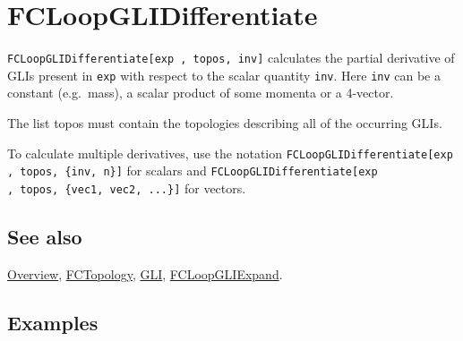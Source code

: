 \documentclass[../FeynCalcManual.tex]{subfiles}
\begin{document}
\hypertarget{fcloopglidifferentiate}{%
\section{FCLoopGLIDifferentiate}\label{fcloopglidifferentiate}}

\texttt{FCLoopGLIDifferentiate[\allowbreak{}exp ,\ \allowbreak{}topos,\ \allowbreak{}inv]}
calculates the partial derivative of GLIs present in \texttt{exp} with
respect to the scalar quantity \texttt{inv}. Here \texttt{inv} can be a
constant (e.g.~mass), a scalar product of some momenta or a 4-vector.

The list topos must contain the topologies describing all of the
occurring GLIs.

To calculate multiple derivatives, use the notation
\texttt{FCLoopGLIDifferentiate[\allowbreak{}exp ,\ \allowbreak{}topos,\ \allowbreak{}\{\allowbreak{}inv,\ \allowbreak{}n\}]}
for scalars and
\texttt{FCLoopGLIDifferentiate[\allowbreak{}exp ,\ \allowbreak{}topos,\ \allowbreak{}\{\allowbreak{}vec1,\ \allowbreak{}vec2,\ \allowbreak{}...\}]}
for vectors.

\subsection{See also}

\hyperlink{toc}{Overview}, \hyperlink{fctopology}{FCTopology},
\hyperlink{gli}{GLI}, \hyperlink{fcloopgliexpand}{FCLoopGLIExpand}.

\subsection{Examples}

\begin{Shaded}
\begin{Highlighting}[]
\OperatorTok{[}\OperatorTok{[}\OperatorTok{,} \OperatorTok{\{}\OperatorTok{,} \OperatorTok{,} \OperatorTok{\}],} 
  \OperatorTok{\{}\OperatorTok{[}\OperatorTok{,} \OperatorTok{\{}\OperatorTok{[\{}\OperatorTok{,}\OperatorTok{\}],}\OperatorTok{[\{}\OperatorTok{,}\OperatorTok{\}],}\OperatorTok{[\{}\SpecialCharTok{{-}}\OperatorTok{,}\OperatorTok{\}]\},} \OperatorTok{\{}\OperatorTok{,}\OperatorTok{\},} \OperatorTok{\{\},} \OperatorTok{\{\},} \OperatorTok{\{\}]\},}\OperatorTok{]}
\end{Highlighting}
\end{Shaded}
\end{document}
